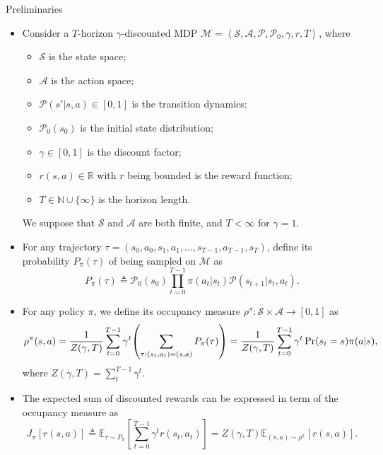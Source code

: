 \documentclass[10pt,aspectratio=169]{beamer}
\begin{document}
\begin{frame}{Preliminaries}
	\begin{itemize}
		\item Consider a $T$-horizon $\gamma$-discounted MDP $\mathcal{M} = \left \langle \mathcal{S}, \mathcal{A}, \mathcal{P}, \mathcal{P}_0, \gamma, r, T \right \rangle$, where
		      \begin{itemize}
			      \item $\mathcal{S}$ is the state space;
			      \item $\mathcal{A}$ is the action space;
			      \item $\mathcal{P}(s'|s,a) \in [0, 1]$ is the transition dynamics;
			      \item $\mathcal{P}_0(s_0)$ is the initial state distribution;
			      \item $\gamma \in [0,1]$ is the discount factor;
			      \item $r(s,a) \in \mathbb{R}$ with $r$ being bounded is the reward function;
			      \item $T \in \mathbb{N} \cup \{\infty\}$ is the horizon length.
		      \end{itemize}
		      We suppose that $\mathcal{S}$ and $\mathcal{A}$ are both finite, and $T<\infty$ for $\gamma = 1$.
		\item For any trajectory $\tau = (s_0, a_0, s_1, a_1, \ldots, s_{T-1}, a_{T-1}, s_T)$, define its probability $P_\pi(\tau)$ of being sampled on $\mathcal{M}$ as
		      \[
			      P_\pi(\tau) \triangleq \mathcal{P}_0(s_0)\prod_{t=0}^{T-1}\pi(a_t|s_t)\mathcal{P}(s_{t+1}| s_t, a_t).
		      \]
		\item For any policy $\pi$, we define its occupancy measure $\rho^\pi: \mathcal{S} \times \mathcal{A} \to [0, 1]$ as
		      \[
			      \rho^\pi(s, a) 
				  = \frac{1}{Z(\gamma, T)}\sum_{t=0}^{T-1} \gamma^t \pqty{\sum_{\tau:(s_t,a_t) = (s,a)} P_\pi(\tau)}
				  = \frac{1}{Z(\gamma, T)}\sum_{t=0}^{T-1} \gamma^t \Pr(s_t=s)\pi(a|s),
		      \]
		      where $Z(\gamma, T) = \sum_t^{T-1}\gamma^t$.
		\item The expected sum of discounted rewards can be expressed in term of the occupancy measure as
		      \[
			      J_\pi[r(s,a)] \triangleq \mathbb{E}_{\tau \sim P_\pi}\left[\sum_{t=0}^{T-1}\gamma^t r(s_t, a_t)\right] = Z(\gamma, T)\mathbb{E}_{(s, a) \sim \rho^\pi}[r(s,a)].
		      \]

\end{itemize}
\end{frame}
\end{document}
